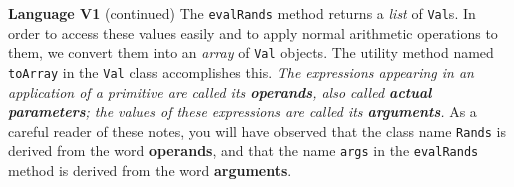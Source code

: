 \begin{minipage}[t]{\sw}
\slidenumber
\LARGE
{\bf Language V1} (continued)\exx
The \verb'evalRands' method returns a {\em list} of \verb'Val's.
In order to access these values easily and
to apply normal arithmetic operations to them,
we convert them into an {\em array} of \verb'Val' objects.
The utility method named \verb'toArray' in the \verb'Val' class
accomplishes this.\exx
{\em The expressions appearing in an application of a primitive
are called its {\bf operands},
also called {\bf actual parameters};
the values of these expressions are called its {\bf arguments}.}\exx
As a careful reader of these notes,
you will have observed that the class name \verb'Rands'
is derived from the word {\bf operands},
and that the name \verb'args' in the \verb'evalRands' method
is derived from the word {\bf arguments}.
\end{minipage}
\clearpage
